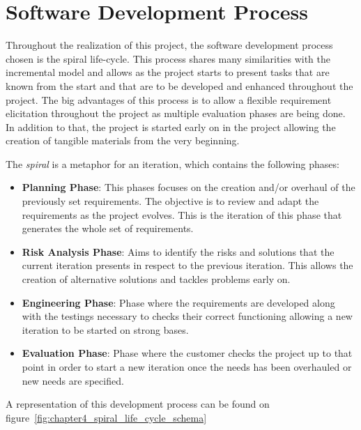 \pagebreak

\section{Software Development Process}\label{sec:chapter4_software_developemnt_process}

Throughout the realization of this project, the software development process chosen is the spiral life-cycle. This process shares many similarities with the incremental model and allows as the project starts to present tasks that are known from the start and that are to be developed and enhanced throughout the project. The big advantages of this process is to allow a flexible requirement elicitation throughout the project as multiple evaluation phases are being done. In addition to that, the project is started early on in the project allowing the creation of tangible materials from the very beginning.

The \textit{spiral} is a metaphor for an iteration, which contains the following phases:
\begin{itemize}
	\item \textbf{Planning Phase}: This phases focuses on the creation and/or overhaul of the previously set requirements. The objective is to review and adapt the requirements as the project evolves. This is the iteration of this phase that generates the whole set of requirements.
	\item \textbf{Risk Analysis Phase}: Aims to identify the risks and solutions that the current iteration presents in respect to the previous iteration. This allows the creation of alternative solutions and tackles problems early on.
	\item \textbf{Engineering Phase}: Phase where the requirements are developed along with the testings necessary to checks their correct functioning allowing a new iteration to be started on strong bases.
	\item \textbf{Evaluation Phase}: Phase where the customer checks the project up to that point in order to start a new iteration once the needs has been overhauled or new needs are specified.
\end{itemize}

A representation\cite{spiral_development} of this development process can be found on figure~\ref{fig:chapter4_spiral_life_cycle_schema}



